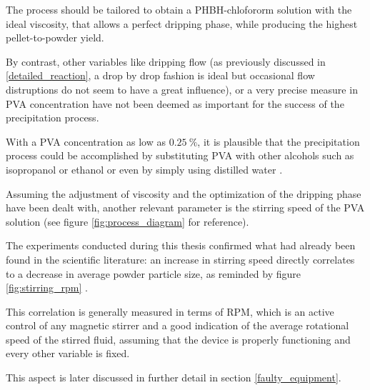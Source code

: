 \documentclass{article}
\begin{document}
        The process should be tailored to obtain a PHBH-chlofororm solution with the ideal viscosity, that allows a perfect dripping 
        phase, while producing the highest pellet-to-powder yield. 


        By contrast, other variables like dripping flow (as previously discussed  in \ref{detailed_reaction}, a drop by drop fashion is ideal but occasional 
        flow distruptions do not seem to have a great influence), or a very precise measure in 
        PVA concentration have not been deemed as important for the success of the precipitation process. 

        With a PVA concentration as low as $0.25 \ \%$, it is plausible that the precipitation process could be accomplished by 
        substituting PVA with other alcohols such as isopropanol or ethanol or even by simply using distilled water \footnotemark.
        

        Assuming the adjustment of viscosity and the optimization of the dripping phase have been dealt with, 
        another relevant parameter is the stirring speed of the PVA solution (see figure \ref{fig:process_diagram} for reference). 

        The experiments conducted during this thesis confirmed what had already been found in the scientific literature: 
        an increase in stirring speed directly correlates to a decrease in average powder particle size, as reminded by figure \ref{fig:stirring_rpm}
        \autocites{DechetMaximilianA2020OtDo}. 

        This correlation is generally measured in terms of RPM, which is an active control of any magnetic stirrer and 
        a good indication of the average rotational speed of the stirred fluid, assuming that the device is properly functioning
        and every other variable is fixed. 
        
%
%
%
%
        This aspect is later discussed in further detail in section \ref{faulty_equipment}. \\ 
\end{document}
